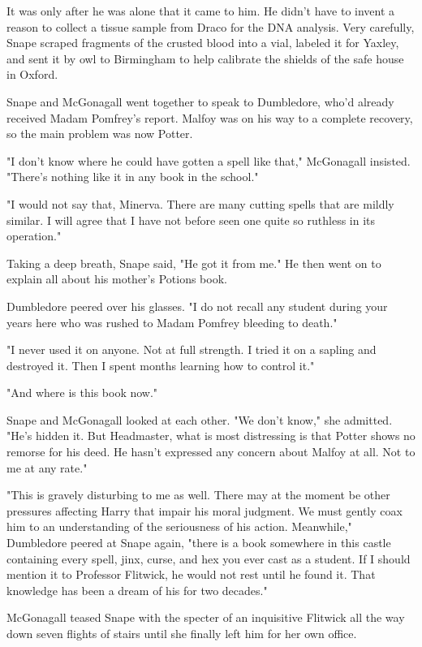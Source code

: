 It was only after he was alone that it came to him. He didn't have to invent a reason to collect a tissue sample from Draco for the DNA analysis. Very carefully, Snape scraped fragments of the crusted blood into a vial, labeled it for Yaxley, and sent it by owl to Birmingham to help calibrate the shields of the safe house in Oxford.

Snape and McGonagall went together to speak to Dumbledore, who'd already received Madam Pomfrey's report. Malfoy was on his way to a complete recovery, so the main problem was now Potter.

"I don't know where he could have gotten a spell like that," McGonagall insisted. "There's nothing like it in any book in the school."

"I would not say that, Minerva. There are many cutting spells that are mildly similar. I will agree that I have not before seen one quite so ruthless in its operation."

Taking a deep breath, Snape said, "He got it from me." He then went on to explain all about his mother's Potions book.

Dumbledore peered over his glasses. "I do not recall any student during your years here who was rushed to Madam Pomfrey bleeding to death."

"I never used it on anyone. Not at full strength. I tried it on a sapling and destroyed it. Then I spent months learning how to control it."

"And where is this book now."

Snape and McGonagall looked at each other. "We don't know," she admitted. "He's hidden it. But Headmaster, what is most distressing is that Potter shows no remorse for his deed. He hasn't expressed any concern about Malfoy at all. Not to me at any rate."

"This is gravely disturbing to me as well. There may at the moment be other pressures affecting Harry that impair his moral judgment. We must gently coax him to an understanding of the seriousness of his action. Meanwhile," Dumbledore peered at Snape again, "there is a book somewhere in this castle containing every spell, jinx, curse, and hex you ever cast as a student. If I should mention it to Professor Flitwick, he would not rest until he found it. That knowledge has been a dream of his for two decades."

McGonagall teased Snape with the specter of an inquisitive Flitwick all the way down seven flights of stairs until she finally left him for her own office.


